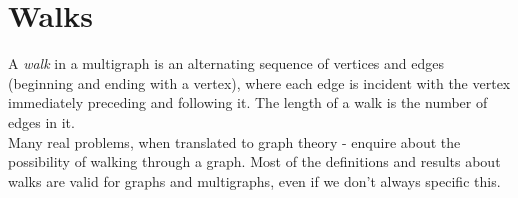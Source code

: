 
\section{Walks}
A \textit{walk} in a multigraph is an alternating sequence of vertices and edges (beginning and ending with a vertex), where each edge is incident with the vertex immediately preceding and following it. The length of a walk is the number of edges in it.\\

Many real problems, when translated to graph theory - enquire about the possibility of walking through a graph. Most of the definitions and results about walks are valid for graphs and multigraphs, even if we don't always specific this.\\

